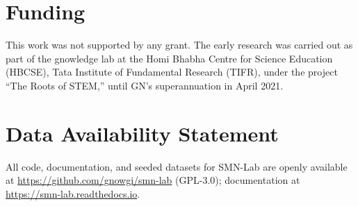 \documentclass[utf8]{FrontiersinHarvard} %
\begin{document}
\section*{Funding}
This work was not supported by any grant. The early research was carried out as part of the gnowledge lab at the Homi Bhabha Centre for Science Education (HBCSE), Tata Institute of Fundamental Research (TIFR), under the project ``The Roots of STEM,'' until GN's superannuation in April 2021.

\section*{Data Availability Statement}
All code, documentation, and seeded datasets for SMN-Lab are openly available at \url{https://github.com/gnowgi/smn-lab} (GPL-3.0); documentation at \url{https://smn-lab.readthedocs.io}.



\end{document}

